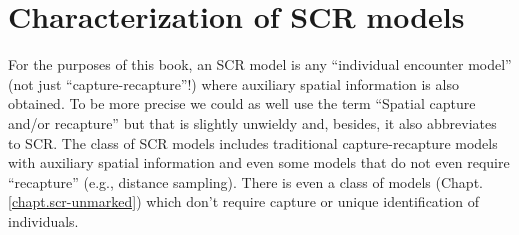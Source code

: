 \section{Characterization of SCR models}
\label{modeling.sec.characterization}

For the purposes of this book, an SCR model is any ``individual
encounter model'' (not just ``capture-recapture''!) where auxiliary
spatial information is also obtained. To be more precise we could as
well use the term ``Spatial capture and/or recapture'' but that is
slightly unwieldy and, besides, it also abbreviates to SCR. The class
of SCR models includes traditional capture-recapture models with
auxiliary spatial information and even some
models that do not even require ``recapture'' (e.g., distance
sampling).  There is even a class of models (Chapt. \ref{chapt.scr-unmarked})
which don't require capture or unique
identification of individuals.

